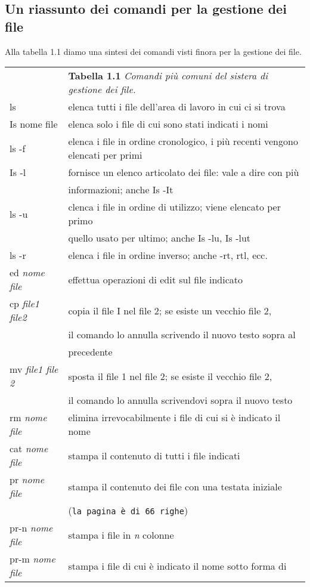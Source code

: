 \subsection{Un riassunto dei comandi per la gestione dei file}
Alla tabella 1.1 diamo una sintesi dei comandi visti finora per la gestione dei file.\\
\begin{tabular}{|ll|}
	\hline
	&\textbf{Tabella 1.1} \textit{Comandi più comuni del sistera di gestione dei file.}\\
	ls&elenca tutti i file dell'area di lavoro in cui ci si trova\\
	Is nome file& elenca solo i file di cui sono stati indicati i nomi\\
	ls -f &elenca i file in ordine cronologico, i più recenti vengono
	elencati per primi\\
	Is -l &fornisce un elenco articolato dei file: vale a dire con più\\
			& informazioni; anche Is -It\\
	ls -u & clenca i file in ordine di utilizzo; viene elencato per primo\\
			& quello usato per ultimo; anche Is -lu, Is -lut\\
	ls -r & elenca i file in ordine inverso; anche -rt, rtl, ecc.\\
	ed {\it nome file} & effettua operazioni di edit sul file indicato\\
	cp \textit{file1 file2} & copia il file I nel file 2; se esiste un vecchio file 2,\\
									& il comando lo annulla scrivendo il nuovo testo sopra al\\
									& precedente\\
	mv \textit{file1 file 2}& sposta il file 1 nel file 2; se esiste il vecchio file 2,\\
	&il comando lo annulla scrivendovi sopra il nuovo testo\\
	rm \textit{nome file}&elimina irrevocabilmente i file di cui si è indicato il nome\\
	cat \textit{nome file}& stampa il contenuto di tutti i file indicati\\
	pr \textit{nome file} &stampa il contenuto dei file con una testata iniziale\\
	&(\texttt{la pagina è di 66 righe})\\
	pr-n \textit{nome file}&stampa i file in \textit{n} colonne\\
	pr-m \textit{nome file} &stampa i file di cui è indicato il nome sotto forma di\\

\end{tabular}
